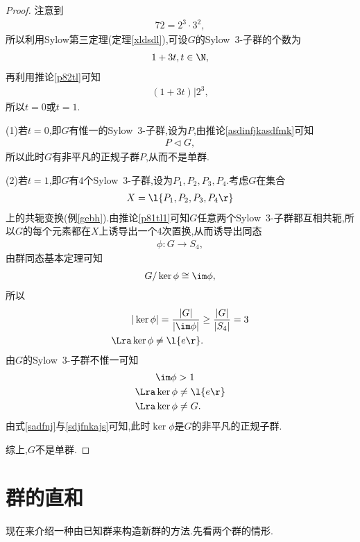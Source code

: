 \begin{proof}
    注意到\begin{align*}
        72=2^3\cdot3^2,
    \end{align*}所以利用Sylow第三定理(定理\ref{xldsdl}),可设$G$的Sylow\ $3$-子群的个数为\begin{align*}
        1+3t,t\in\N,
    \end{align*}再利用推论\ref{p82tl}可知\begin{align*}
        (1+3t)|2^3,
    \end{align*}所以$t=0$或$t=1$.

    (1)若$t=0$,即$G$有惟一的Sylow\ $3$-子群,设为$P$,由推论\ref{asdinfjkasdfmk}可知\begin{align*}
        P\lhd G,
    \end{align*}所以此时$G$有非平凡的正规子群$P$,从而不是单群.

    (2)若$t=1$,即$G$有$4$个Sylow\ $3$-子群,设为$P_1,P_2,P_3,P_4$.考虑$G$在集合\begin{align*}
        X=\l\{P_1,P_2,P_3,P_4\r\}
    \end{align*}上的共轭变换(例\ref{gebh}).由推论\ref{p81tl1}可知$G$任意两个Sylow\ $3$-子群都互相共轭,所以$G$的每个元素都在$X$上诱导出一个$4$次置换,从而诱导出同态\begin{align*}
        \phi:G\to S_4,
    \end{align*}由群同态基本定理可知\begin{align*}
        G/\ker\phi\cong\im\phi,
    \end{align*}所以\begin{align}
        &|\ker\phi|=\frac{|G|}{|\im\phi|}\geq\frac{|G|}{|S_4|}=3\nonumber\\
        \Lra&\ker\phi\neq\l\{e\r\}.\label{sadfnj}
    \end{align}由$G$的Sylow\ $3$-子群不惟一可知\begin{align}
        &\im\phi>1\nonumber\\
        \Lra&\ker\phi\neq\l\{e\r\}\nonumber\\
        \Lra&\ker\phi\neq G.\label{sdjfnkajs}
    \end{align}由式\eqref{sadfnj}与\eqref{sdjfnkajs}可知,此时$\ker\phi$是$G$的非平凡的正规子群.

    综上,$G$不是单群.
\end{proof}
\section{群的直和}
现在来介绍一种由已知群来构造新群的方法.先看两个群的情形.

